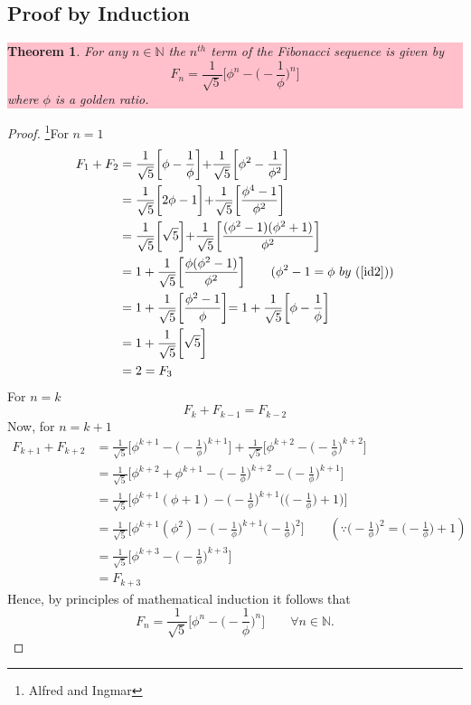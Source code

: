 \documentclass[paper=a4, fontsize=11pt,twoside]{scrartcl}		%
\newtheorem{thm}{Theorem}[section]
\theoremstyle{definition}
\theoremstyle{remark}
\begin{document}
\subsection{Proof by Induction}
\colorbox{pink}{\parbox{\textwidth}{
\begin{thm}
For any $n\in \mathbb{N}$ the $n^{th}$ term of the Fibonacci sequence is given by
$$F_n=\frac{1}{\sqrt{5}}\biggl[\phi^n-\biggl(-\frac{1}{\phi}\biggl)^n \biggl]$$
where $\phi$ is a golden ratio.
\end{thm}}}
\begin{proof}
\footnote{Alfred and Ingmar}For $n=1$
\begin{align*}
F_1+F_2 &=\frac{1}{\sqrt{5}}\biggl[\phi-\frac{1}{\phi} \biggl] +\frac{1}{\sqrt{5}}\biggl[\phi^2-\frac{1}{\phi^2} \biggl]\\
        &=\frac{1}{\sqrt{5}}\biggl[2\phi-1 \biggl]+\frac{1}{\sqrt{5}}\biggl[\frac{\phi^4-1}{\phi^2} \biggl]\\
        &=\frac{1}{\sqrt{5}}\biggl[\sqrt{5}\biggl]+\frac{1}{\sqrt{5}}\biggl[\frac{(\phi^2-1)(\phi^2+1)}{\phi^2} \biggl]\\
        &=1+\frac{1}{\sqrt{5}}\biggl[\frac{\phi(\phi^2-1)}{\phi^2} \biggl] \qquad (\phi^2-1=\phi ~by~(\ref{id2}))\\
        &=1+\frac{1}{\sqrt{5}}\biggl[\frac{\phi^2-1}{\phi} \biggl]=1+\frac{1}{\sqrt{5}}\biggl[\phi-\frac{1}{\phi} \biggl]\\
        &=1+\frac{1}{\sqrt{5}}\biggl[\sqrt{5} \biggl]\\
        &=2=F_3
\end{align*}
For $n=k$
$$
F_k +F_{k-1}=F_{k-2}
$$
Now, for $n=k+1$
\begin{align*}
F_{k+1}+F_{k+2} &=\frac{1}{\sqrt{5}}\biggl[\phi^{k+1}-\biggl(-\frac{1}{\phi}\biggl)^{k+1} \biggl] +\frac{1}{\sqrt{5}}\biggl[\phi^{k+2}-\biggl(-\frac{1}{\phi}\biggl)^{k+2} \biggl]\\
        &=\frac{1}{\sqrt{5}}\biggl[\phi^{k+2}+\phi^{k+1}-\biggl(-\frac{1}{\phi}\biggl)^{k+2}-\biggl(-\frac{1}{\phi}\biggl)^{k+1} \biggl]\\
        &=\frac{1}{\sqrt{5}}\biggl[\phi^{k+1}(\phi+1)-\biggl(-\frac{1}{\phi}\biggl)^{k+1}\biggl(\biggl(-\frac{1}{\phi}\biggl)+1\biggl) \biggl]\\
        &=\frac{1}{\sqrt{5}}\biggl[\phi^{k+1}(\phi^2)-\biggl(-\frac{1}{\phi}\biggl)^{k+1}\biggl(-\frac{1}{\phi}\biggl)^2 \biggl]\qquad (  \because \biggl(-\frac{1}{\phi}\biggl)^2= \biggl(-\frac{1}{\phi}\biggl)+1)\\
        &=\frac{1}{\sqrt{5}}\biggl[\phi^{k+3}-\biggl(-\frac{1}{\phi}\biggl)^{k+3} \biggl]\\
        &=F_{k+3}
\end{align*}
Hence, by principles of mathematical induction it follows that
$$
F_n=\frac{1}{\sqrt{5}}\biggl[\phi^n-\biggl(-\frac{1}{\phi}\biggl)^n \biggl] \qquad \forall n\in \mathbb{N}.
$$
\end{proof}
\end{document}
